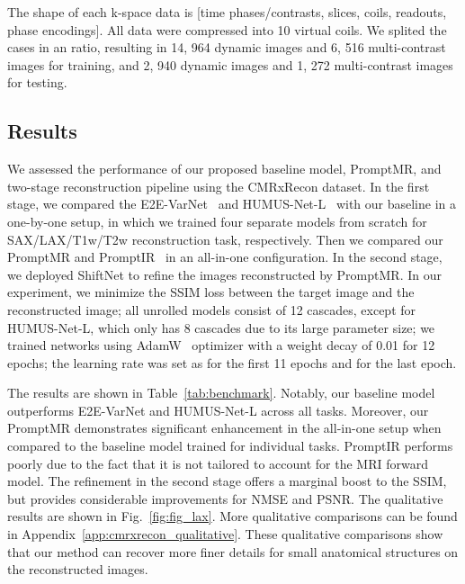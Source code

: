 \documentclass[runningheads]{llncs}
\begin{document}
The shape of each k-space data is [time phases/contrasts, slices, coils, readouts, phase encodings]. 
All data were compressed into 10 virtual coils. We splited the cases in an  ratio, resulting in 14, 964 dynamic images and 6, 516 multi-contrast images for training, and 2, 940 dynamic images and 1, 272 multi-contrast images for testing.

\subsection{Results}
We assessed the performance of our proposed baseline model, PromptMR, and two-stage reconstruction pipeline using the CMRxRecon dataset. In the first stage, we compared the E2E-VarNet~\cite{sriram2020end} and HUMUS-Net-L~\cite{fabian2022humus} with our baseline in a one-by-one setup, in which we trained four separate models from scratch for SAX/LAX/T1w/T2w reconstruction task, respectively. Then we compared our PromptMR and PromptIR~\cite{potlapalli2023promptir} in an all-in-one configuration. 
In the second stage, we deployed ShiftNet to refine the images reconstructed by PromptMR. In our experiment,  we minimize the SSIM loss between the target image and the reconstructed image; all unrolled models consist of 12 cascades, except for HUMUS-Net-L, which only has 8 cascades due to its large parameter size; we trained networks using AdamW~\cite{loshchilov2017decoupled} optimizer with a weight decay of 0.01 for 12 epochs; the learning rate was set as  for the first 11 epochs and  for the last epoch. 

The results are shown in Table~\ref{tab:benchmark}. Notably, our baseline model outperforms E2E-VarNet and HUMUS-Net-L across all tasks. Moreover, our PromptMR demonstrates significant enhancement in the all-in-one setup when compared to the baseline model trained for individual tasks. PromptIR performs poorly due to the fact that it is not tailored to account for the MRI forward model. The refinement in the second stage offers a marginal boost to the SSIM, but provides considerable improvements for NMSE and PSNR. The qualitative results are shown in Fig.~\ref{fig:fig_lax}. More qualitative comparisons can be found in Appendix~\ref{app:cmrxrecon_qualitative}. 
These qualitative comparisons show that our method can recover more finer details for small anatomical structures on the reconstructed images.
\end{document}
